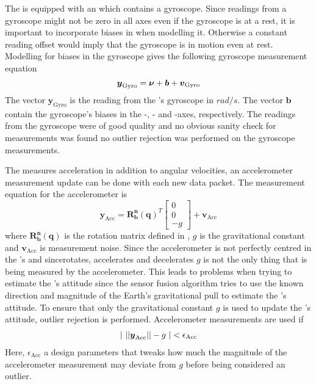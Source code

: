 The \abbrROV is equipped with an \abbrIMU which contains a gyroscope. Since readings from a gyroscope might not be zero in all axes even if the gyroscope is at a rest, it is important to incorporate biases in when modelling it. Otherwise a constant reading offset would imply that the gyroscope is in motion even at rest. Modelling for biases in the gyroscope gives the following gyroscope measurement equation
\begin{equation}\label{eq:gyro}
\boldsymbol{y}_\text{Gyro}= \boldsymbol{\nu} + \boldsymbol{b} + \boldsymbol{v}_{\text{Gyro}}
\end{equation}
 The vector $\boldsymbol{y}_\text{Gyro}$ is the reading from the \abbrIMU's gyroscope in $rad/s$. The vector $\boldsymbol{b}$ contain the gyroscope's biases in the \xPosition-, \yPosition- and \zPosition-axes, respectively.
The readings from the gyroscope were of good quality and no obvious sanity check for measurements was found no outlier rejection was performed on the gyroscope measurements. %

The \abbrIMU measures acceleration in addition to angular velocities, an accelerometer measurement update can be done with each new \abbrIMU data packet. The measurement equation for the accelerometer is
\begin{equation}
\boldsymbol{y}_{\text{Acc}} =
    \boldsymbol{R^n_b}(\boldsymbol{q})^T
    \begin{bmatrix}
    0\\
    0\\
    -g
    \end{bmatrix}
+ \boldsymbol{v}_{\text{Acc}}
\end{equation}
    where $\boldsymbol{R^n_b}(\boldsymbol{q})$ is the rotation matrix defined in , $g$ is the gravitational constant and $\boldsymbol{v}_{\text{Acc}}$ is measurement noise. Since the accelerometer is not perfectly centred in the \abbrROV's \abbrCG and since\abbrROV rotates, accelerates and decelerates $g$ is not the only thing that is being measured by the accelerometer. This leads to problems when trying to estimate the \abbrROV's attitude since the sensor fusion algorithm tries to use the known direction and magnitude of the Earth's gravitational pull to estimate the \abbrROV's attitude. To ensure that only the gravitational constant $g$ is used to update the \abbrROV's attitude, outlier rejection is performed. Accelerometer measurements are used if 
\begin{align}
    |~||
    \boldsymbol{y}_{\text{Acc}}
||
    -g
     ~| < \epsilon_{\text{Acc}}
\end{align}
Here, $\epsilon_{\text{Acc}}$ a design parameters that tweaks how much the magnitude of the accelerometer measurement may deviate from $g$ before being considered an outlier.



